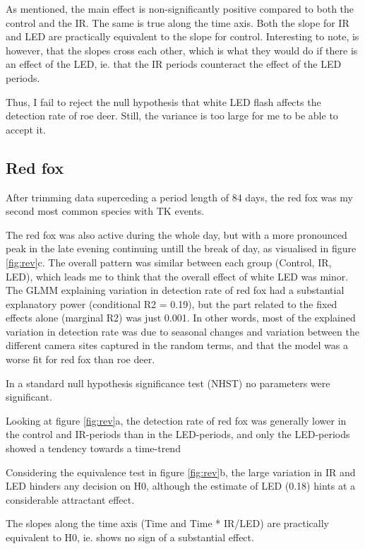 As mentioned, the main effect is non-significantly positive compared to both the control and the IR.
The same is true along the time axis. Both the slope for IR and LED are practically equivalent to the slope for control. Interesting to note, is however, that the slopes cross each other, which is what they would do if there is an effect of the LED, ie. that the IR periods counteract the effect of the LED periods.

Thus, I fail to reject the null hypothesis that white LED flash affects the detection rate of roe deer. Still, the variance is too large for me to be able to accept it. %


\subsection{Red fox}

After trimming data superceding a period length of 84 days,
the red fox was my second most common species with TK events.

The red fox was also active during the whole day, but with a more pronounced peak in the late evening continuing untill the break of day, as visualised in figure \ref{fig:rev}c.
The overall pattern was similar between each group (Control, IR, LED), which leads me to think that the overall effect of white LED was minor.
The GLMM explaining variation in detection rate of red fox had a substantial explanatory power (conditional R2 = 0.19), but the part related to the fixed effects alone (marginal R2) was just 0.001.
In other words, most of the explained variation in detection rate was due to seasonal changes and variation between the different camera sites captured in the random terms, and that the model was a worse fit for red fox than roe deer.

In a standard null hypothesis significance test (NHST) no parameters were significant.

Looking at figure \ref{fig:rev}a, the detection rate of red fox was generally lower in the control and IR-periods than in the LED-periods, and only the LED-periods showed a tendency towards a time-trend

Considering the equivalence test in figure \ref{fig:rev}b, the large variation in IR and LED hinders any decision on H0, although the estimate of LED (0.18) hints at a considerable attractant effect.

The slopes along the time axis (Time and Time * IR/LED) are practically equivalent to H0, ie. shows no sign of a substantial effect.


